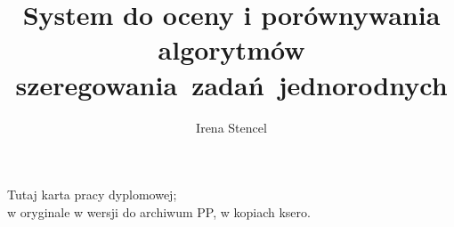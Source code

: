\documentclass[polish,a4paper,oneside]{../fcm-unofficial/ppfcmthesis}
\author{Irena Stencel}
\title{System do oceny i porównywania algorytmów szeregowania~zadań~jednorodnych}
\begin{document}
\maketitle\cleardoublepage\thispagestyle{empty}\vspace*{\fill}\noindent\begin{center}%
Tutaj karta pracy dyplomowej;\\w oryginale w wersji do archiwum PP, w kopiach ksero.\end{center}\vfill\cleardoublepage%

\frontmatter{}\cleardoublepage%

\mainmatter%



\appendix



\backmatter%
{\small}

\ppcolophon
\end{document}
